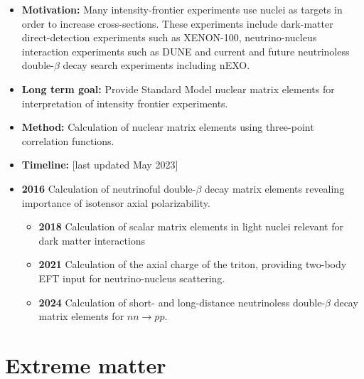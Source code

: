 \documentclass[12pt,hyperpdf]{article}
\begin{document}
\begin{itemize}  
    \item{\bf Motivation:} Many intensity-frontier experiments use nuclei as targets in order to increase cross-sections. These experiments include dark-matter direct-detection experiments such as XENON-100, neutrino-nucleus interaction experiments such as DUNE and current and future neutrinoless double-$\beta$ decay search experiments including nEXO.
    
    \item{\bf Long term goal:}  Provide Standard Model nuclear matrix elements for interpretation of intensity frontier experiments.
    
    \item{\bf Method:} 
    Calculation of nuclear matrix elements using three-point correlation functions.
    
\item{\bf Timeline:} \hfill [last updated May 2023]
\item{\bf 2016} Calculation of neutrinoful double-$\beta$ decay matrix elements revealing importance of isotensor axial polarizability.
\begin{itemize}
    \item{\bf 2018} Calculation of scalar matrix elements in light nuclei relevant for dark matter interactions 
    \item{\bf 2021} Calculation of the axial charge of the triton, providing two-body EFT input for neutrino-nucleus scattering.
    \item{\bf 2024} Calculation of short- and long-distance neutrinoless double-$\beta$ decay matrix elements for $nn\to pp$.
\end{itemize}
\end{itemize}


\section{Extreme matter}\label{sec:extreme}

\end{document}

